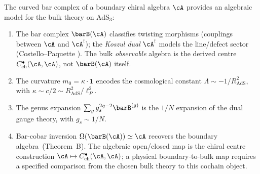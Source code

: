\begin{conjecture}\label{conj:ads-cft-bar}
The curved bar complex of a boundary chiral algebra $\cA$ provides
an algebraic model for the bulk theory on AdS$_3$:
\begin{enumerate}[label=\textup{(\roman*)}]
\item The bar complex $\barB(\cA)$ classifies twisting morphisms
 (couplings between $\cA$ and $\cA^!$); the \emph{Koszul dual}
 $\cA^!$ models the line/defect sector
 \textup{(}Costello--Paquette \cite{CP2020}\textup{)}. The bulk
 \emph{observable} algebra is the derived centre
 $C^\bullet_{\mathrm{ch}}(\cA, \cA)$, not $\barB(\cA)$
 itself.
\item The curvature $m_0 = \kappa \cdot \mathbf{1}$ encodes
 the cosmological constant $\Lambda \sim -1/R_{\mathrm{AdS}}^2$,
 with $\kappa \sim c/2 \sim R_{\mathrm{AdS}}^2/\ell_P^2$.
\item The genus expansion $\sum_g g_s^{2g-2} \barB^{(g)}$
 is the $1/N$ expansion of the dual gauge theory, with
 $g_s \sim 1/N$.
\item Bar-cobar inversion $\Omega(\barB(\cA)) \simeq \cA$
 recovers the boundary algebra~(Theorem~B). The
 algebraic open/closed map is the chiral centre construction
 $\cA \mapsto C^\bullet_{\mathrm{ch}}(\cA, \cA)$; a physical
 boundary-to-bulk map requires a specified comparison from the
 chosen bulk theory to this cochain object.
\end{enumerate}
\end{conjecture}

